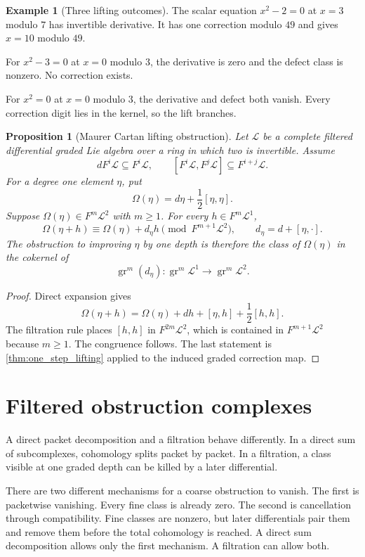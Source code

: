 \documentclass{aomart}
\newtheorem{proposition}[proposition]{Proposition}
\theoremstyle{definition}
\newtheorem{example}[example]{Example}
\theoremstyle{remark}
\newcommand{\Lcal}{\mathcal L}
\newcommand{\gr}{\operatorname{gr}}
\begin{document}
\begin{example}[Three lifting outcomes]\label{ex:three_lifting_outcomes}
The scalar equation $x^2-2=0$ at $x=3$ modulo $7$ has invertible derivative.  It has one correction modulo $49$ and gives $x=10$ modulo $49$.

For $x^2-3=0$ at $x=0$ modulo $3$, the derivative is zero and the defect class is nonzero.  No correction exists.

For $x^2=0$ at $x=0$ modulo $3$, the derivative and defect both vanish.  Every correction digit lies in the kernel, so the lift branches.
\end{example}

\begin{proposition}[Maurer Cartan lifting obstruction]\label{prop:maurer_cartan_lifting}
Let $\Lcal$ be a complete filtered differential graded Lie algebra over a ring in which two is invertible.  Assume
\[
dF^i\Lcal\subseteq F^i\Lcal,
\qquad
[F^i\Lcal,F^j\Lcal]\subseteq F^{i+j}\Lcal.
\]
For a degree one element $\eta$, put
\[
\Omega(\eta)=d\eta+\frac12[\eta,\eta].
\]
Suppose $\Omega(\eta)\in F^m\Lcal^2$ with $m\ge1$.  For every $h\in F^m\Lcal^1$,
\[
\Omega(\eta+h)
\equiv
\Omega(\eta)+d_\eta h
\pmod{F^{m+1}\Lcal^2},
\qquad
d_\eta=d+[\eta,\mathord\cdot].
\]
The obstruction to improving $\eta$ by one depth is therefore the class of $\Omega(\eta)$ in the cokernel of
\[
\gr^m(d_\eta):
\gr^m\Lcal^1
\longrightarrow
\gr^m\Lcal^2.
\]
\end{proposition}

\begin{proof}
Direct expansion gives
\[
\Omega(\eta+h)
=
\Omega(\eta)+dh+[\eta,h]+\frac12[h,h].
\]
The filtration rule places $[h,h]$ in $F^{2m}\Lcal^2$, which is contained in $F^{m+1}\Lcal^2$ because $m\ge1$.  The congruence follows.  The last statement is \cref{thm:one_step_lifting} applied to the induced graded correction map.
\end{proof}

\section{Filtered obstruction complexes}\label{sec:obstruction_spectral_sequence}

A direct packet decomposition and a filtration behave differently.  In a direct sum of subcomplexes, cohomology splits packet by packet.  In a filtration, a class visible at one graded depth can be killed by a later differential.


There are two different mechanisms for a coarse obstruction to vanish.  The first is packetwise vanishing.  Every fine class is already zero.  The second is cancellation through compatibility.  Fine classes are nonzero, but later differentials pair them and remove them before the total cohomology is reached.  A direct sum decomposition allows only the first mechanism.  A filtration can allow both.
\end{document}
